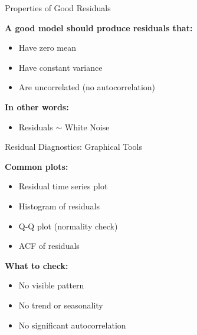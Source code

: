 \documentclass[aspectratio=169]{beamer}
\begin{document}
\begin{frame}{Properties of Good Residuals}

\textbf{A good model should produce residuals that:}

\begin{itemize}
    \item Have zero mean
    \item Have constant variance
    \item Are uncorrelated (no autocorrelation)
\end{itemize}

\vspace{0.4cm}

\textbf{In other words:}
\begin{itemize}
    \item Residuals $\sim$ White Noise
\end{itemize}

\end{frame}

\begin{frame}{Residual Diagnostics: Graphical Tools}

\textbf{Common plots:}
\begin{itemize}
    \item Residual time series plot
    \item Histogram of residuals
    \item Q-Q plot (normality check)
    \item ACF of residuals
\end{itemize}

\vspace{0.4cm}

\textbf{What to check:}
\begin{itemize}
    \item No visible pattern
    \item No trend or seasonality
    \item No significant autocorrelation
\end{itemize}

\end{frame}
\end{document}
